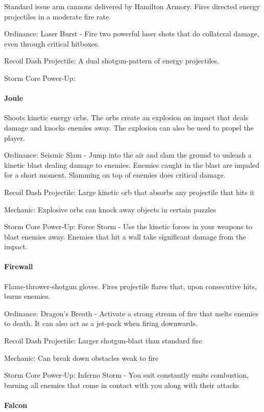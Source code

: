 \documentclass[../Main.tex]{subfiles}
\begin{document}
Standard issue arm cannons delivered by Hamilton Armory. Fires directed energy projectiles in a moderate fire rate. 

Ordinance: Laser Burst - Fire two powerful laser shots that do collateral damage, even through critical hitboxes.

Recoil Dash Projectile: A dual shotgun-pattern of energy projectiles.

Storm Core Power-Up:

\paragraph{Joule}

Shoots kinetic energy orbs. The orbs create an explosion on impact that deals damage and knocks enemies away. The explosion can also be used to propel the player.

Ordinance: Seismic Slam - Jump into the air and slam the ground to unleash a kinetic blast dealing damage to enemies. Enemies caught in the blast are impaled for a short moment. Slamming on top of enemies does critical damage. 

Recoil Dash Projectile: Large kinetic orb that absorbs any projectile that hits it

Mechanic: Explosive orbs can knock away objects in certain puzzles

Storm Core Power-Up: Force Storm - Use the kinetic forces in your weapons to blast enemies away. Enemies that hit a wall take significant damage from the impact. 

\paragraph{Firewall}

Flame-thrower-shotgun gloves. Fires projectile flares that, upon consecutive hits, burns enemies.

Ordinance: Dragon's Breath - Activate a strong stream of fire that melts enemies to death. It can also act as a jet-pack when firing downwards.

Recoil Dash Projectile: Larger shotgun-blast than standard fire

Mechanic: Can break down obstacles weak to fire

Storm Core Power-Up: Inferno Storm - You suit constantly emits combustion, burning all enemies that come in contact with you along with their attacks

\paragraph{Falcon}
\end{document}
